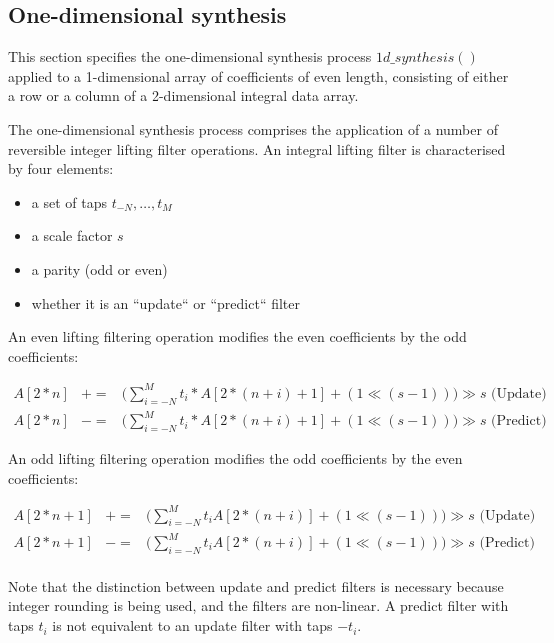 \subsection{One-dimensional synthesis}

This section specifies the one-dimensional synthesis process
$1d\_synthesis()$ applied to a 1-dimensional array of coefficients of
even length, consisting
of either a row or a column of a 2-dimensional integral data array.

The one-dimensional synthesis process comprises the application of a
number of reversible integer lifting filter operations. An integral lifting filter
 is characterised by four elements:
\begin{itemize}
\item a set of taps $t_{-N}, \hdots,t_M$
\item a scale factor $s$
\item a parity (odd or even)
\item whether it is an ``update`` or ``predict`` filter
\end{itemize}

An even lifting filtering operation modifies the even coefficients
by the odd coefficients:

\begin{eqnarray*}
  A[2*n]& +=& \big( \sum^M_{i=-N} t_i *A[2*(n+i) + 1] +(1\ll (s-1))\big) \gg s \mbox{ (Update)} \\
  A[2*n]& -=& \big( \sum^M_{i=-N} t_i *A[2*(n+i) + 1] +(1\ll (s-1))\big) \gg s \mbox{ (Predict)}
\end{eqnarray*}

An odd lifting filtering operation modifies the odd coefficients
 by the even coefficients:

\begin{eqnarray*}
  A[2*n+1]& +=&  \big( \sum^M_{i=-N} t_i A[2*(n+i)]+(1\ll (s-1)) \big) \gg s \mbox{ (Update)} \\
  A[2*n+1]& -=&  \big( \sum^M_{i=-N} t_i A[2*(n+i)] +(1\ll (s-1))\big) \gg s \mbox{ (Predict)} \\
\end{eqnarray*}

\begin{informative}
Note that the distinction between update and predict filters is necessary
because integer rounding is being used, and the filters are non-linear.
A predict filter with taps $t_i$ is not equivalent to an update filter with taps $-t_i$.
\end{informative}

